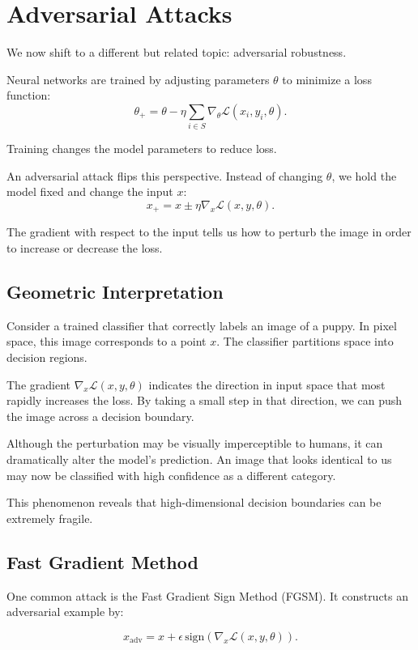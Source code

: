\section{Adversarial Attacks}
\medskip

We now shift to a different but related topic: adversarial robustness.

Neural networks are trained by adjusting parameters $\theta$ to minimize a loss function:
\[
\theta_{+}
=
\theta
-
\eta
\sum_{i \in S}
\nabla_\theta \mathcal{L}(x_i, y_i, \theta).
\]

Training changes the model parameters to reduce loss.

An adversarial attack flips this perspective. Instead of changing $\theta$, we hold the model fixed and change the input $x$:
\[
x_{+}
=
x
\pm
\eta
\nabla_x \mathcal{L}(x, y, \theta).
\]

The gradient with respect to the input tells us how to perturb the image in order to increase or decrease the loss.

\bigskip
\subsection{Geometric Interpretation}
\medskip

Consider a trained classifier that correctly labels an image of a puppy. In pixel space, this image corresponds to a point $x$. The classifier partitions space into decision regions.

The gradient $\nabla_x \mathcal{L}(x, y, \theta)$ indicates the direction in input space that most rapidly increases the loss. By taking a small step in that direction, we can push the image across a decision boundary.

Although the perturbation may be visually imperceptible to humans, it can dramatically alter the model's prediction. An image that looks identical to us may now be classified with high confidence as a different category.

This phenomenon reveals that high-dimensional decision boundaries can be extremely fragile.

\bigskip
\subsection{Fast Gradient Method}
\medskip

One common attack is the Fast Gradient Sign Method (FGSM). It constructs an adversarial example by:

\[
x_{\text{adv}}
=
x
+
\epsilon \,\text{sign}\!\left(
\nabla_x \mathcal{L}(x, y, \theta)
\right).
\]

